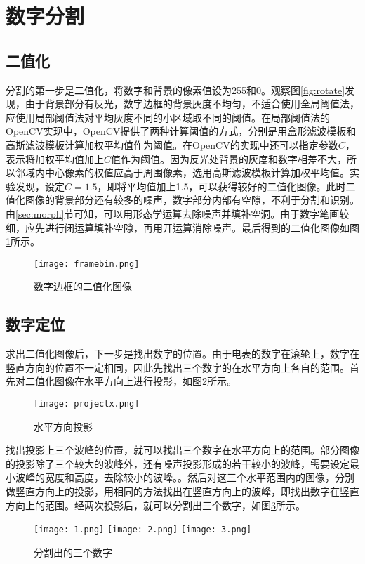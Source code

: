 \section{数字分割}

\subsection{二值化}


分割的第一步是二值化，将数字和背景的像素值设为255和0。观察图\ref{fig:rotate}发现，由于背景部分有反光，数字边框的背景灰度不均匀，不适合使用全局阈值法，应使用局部阈值法对平均灰度不同的小区域取不同的阈值。在局部阈值法的OpenCV实现中，OpenCV提供了两种计算阈值的方式，分别是用盒形滤波模板和高斯滤波模板计算加权平均值作为阈值。在OpenCV的实现中还可以指定参数$C$，表示将加权平均值加上$C$值作为阈值。因为反光处背景的灰度和数字相差不大，所以邻域内中心像素的权值应高于周围像素，选用高斯滤波模板计算加权平均值。实验发现，设定$C=1.5$，即将平均值加上1.5，可以获得较好的二值化图像。此时二值化图像的背景部分还有较多的噪声，数字部分内部有空隙，不利于分割和识别。由\ref{sec:morph}节可知，可以用形态学运算去除噪声并填补空洞。由于数字笔画较细，应先进行闭运算填补空隙，再用开运算消除噪声。最后得到的二值化图像如图\ref{fig:framebin}所示。
\begin{figure}[h]
  \centering
  \texttt{[image: framebin.png]}
  \caption{数字边框的二值化图像}
  \label{fig:framebin}
\end{figure}

\subsection{数字定位}


求出二值化图像后，下一步是找出数字的位置。由于电表的数字在滚轮上，数字在竖直方向的位置不一定相同，因此先找出三个数字的在水平方向上各自的范围。首先对二值化图像在水平方向上进行投影，如图\ref{fig:projectx}所示。
\begin{figure}[h]
  \centering
  \texttt{[image: projectx.png]}
  \caption{水平方向投影}
  \label{fig:projectx}
\end{figure}
找出投影上三个波峰的位置，就可以找出三个数字在水平方向上的范围。部分图像的投影除了三个较大的波峰外，还有噪声投影形成的若干较小的波峰，需要设定最小波峰的宽度和高度，去除较小的波峰。。然后对这三个水平范围内的图像，分别做竖直方向上的投影，用相同的方法找出在竖直方向上的波峰，即找出数字在竖直方向上的范围。经两次投影后，就可以分割出三个数字，如图\ref{fig:digit}所示。
\begin{figure}[h]
  \centering
  \texttt{[image: 1.png]}\hspace{1cm}
  \texttt{[image: 2.png]}\hspace{1cm}
  \texttt{[image: 3.png]}
  \caption{分割出的三个数字}
  \label{fig:digit}
\end{figure}

